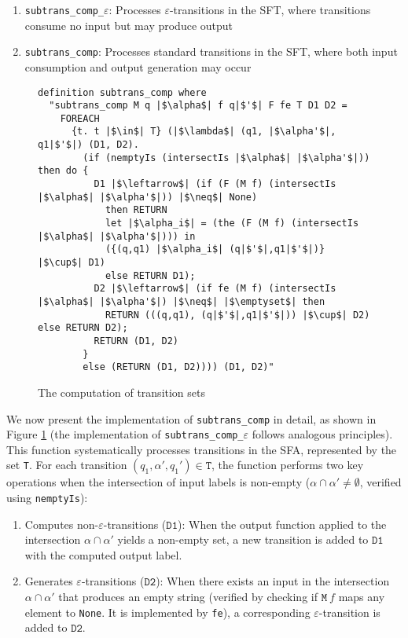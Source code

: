 \documentclass[a4paper,UKenglish,cleveref, autoref, anonymous, thm-restate]{lipics-v2021}
\begin{document}
\begin{enumerate}
  \item \texttt{subtrans\_comp\_$\varepsilon$}: Processes $\varepsilon$-transitions in the SFT, where transitions consume no input but may produce output
  \item \texttt{subtrans\_comp}: Processes standard transitions in the SFT, where both input consumption and output generation may occur
\end{enumerate}




\begin{figure}[hbt!]
	\begin{lstlisting}
definition subtrans_comp where
  "subtrans_comp M q |$\alpha$| f q|$'$| F fe T D1 D2 =
    FOREACH
      {t. t |$\in$| T} (|$\lambda$| (q1, |$\alpha'$|, q1|$'$|) (D1, D2).
        (if (nemptyIs (intersectIs |$\alpha$| |$\alpha'$|)) then do {
          D1 |$\leftarrow$| (if (F (M f) (intersectIs |$\alpha$| |$\alpha'$|)) |$\neq$| None) 
            then RETURN 
            let |$\alpha_i$| = (the (F (M f) (intersectIs |$\alpha$| |$\alpha'$|))) in
            ({(q,q1) |$\alpha_i$| (q|$'$|,q1|$'$|)} |$\cup$| D1)
            else RETURN D1);
          D2 |$\leftarrow$| (if fe (M f) (intersectIs |$\alpha$| |$\alpha'$|) |$\neq$| |$\emptyset$| then 
            RETURN (((q,q1), (q|$'$|,q1|$'$|)) |$\cup$| D2) else RETURN D2);
          RETURN (D1, D2)
        }
        else (RETURN (D1, D2)))) (D1, D2)"
    \end{lstlisting}
    \caption{The computation of transition sets}
    \label{fig-def-subtrans_comp}
    \end{figure}


    We now present the implementation of \texttt{subtrans\_comp} in detail, as shown in Figure \ref{fig-def-subtrans_comp} (the implementation of \texttt{subtrans\_comp\_$\varepsilon$} follows analogous principles). This function systematically processes transitions in the SFA, represented by the set \texttt{T}. For each transition $(q_1, \alpha', q_1')\in \texttt{T}$, the function performs two key operations when the intersection of input labels is non-empty ($\alpha \cap \alpha' \neq \emptyset$, verified using \texttt{nemptyIs}):

    \begin{enumerate}
      \item Computes non-$\varepsilon$-transitions ($\texttt{D1}$): When the output function applied to the intersection $\alpha \cap \alpha'$ yields a non-empty set, a new transition is added to $\texttt{D1}$ with the computed output label.
      \item Generates $\varepsilon$-transitions ($\texttt{D2}$): When there exists an input in the intersection $\alpha \cap \alpha'$ that produces an empty string (verified by checking if $\texttt{M}~f$ maps any element to \texttt{None}. It is implemented by \texttt{fe}), a corresponding $\varepsilon$-transition is added to $\texttt{D2}$.
    \end{enumerate}
    
\end{document}
